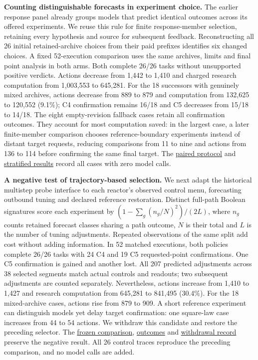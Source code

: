 \documentclass[twoside,11pt]{article}
\begin{document}
\textbf{Counting distinguishable forecasts in experiment choice.} The earlier response panel already groups models that predict identical outcomes across its offered experiments. We reuse this rule for finite response-member selection, retaining every hypothesis and source for subsequent feedback. Reconstructing all 26 initial retained-archive choices from their paid prefixes identifies six changed choices. A fixed 52-execution comparison uses the same archives, limits and final point analysis in both arms. Both complete 26/26 tasks without unsupported positive verdicts. Actions decrease from 1,442 to 1,410 and charged research computation from 1,003,553 to 645,281. For the 18 successors with genuinely mixed archives, actions decrease from 889 to 879 and computation from 132,625 to 120,552 (9.1\%); C4 confirmation remains 16/18 and C5 decreases from 15/18 to 14/18. The eight empty-revision fallback cases retain all confirmation outcomes. They account for most computation saved: in the largest case, a later finite-member comparison chooses reference-boundary experiments instead of distant target requests, reducing comparisons from 11 to nine and actions from 136 to 114 before confirming the same final target. The \hyperlink{artifact-153}{paired protocol} and \hyperlink{artifact-154}{stratified results} record all cases with zero model calls.


\textbf{A negative test of trajectory-based selection.} We next adapt the historical multistep probe interface to each reactor's observed control menu, forecasting outbound tuning and declared reference restoration. Distinct full-path Boolean signatures score each experiment by \((1-\sum_g(n_g/N)^2)/(2L)\), where \(n_g\) counts retained forecast classes sharing a path outcome, \(N\) is their total and \(L\) is the number of tuning adjustments. Repeated observations of the same split add cost without adding information. In 52 matched executions, both policies complete 26/26 tasks with 24 C4 and 19 C5 requested-point confirmations. One C5 confirmation is gained and another lost. All 207 predicted adjustments across 38 selected segments match actual controls and readouts; two subsequent adjustments are counted separately. Nevertheless, actions increase from 1,410 to 1,427 and research computation from 645,281 to 841,495 (30.4\%). For the 18 mixed-archive cases, actions rise from 879 to 909. A short reference experiment can distinguish models yet delay target confirmation: one square-law case increases from 44 to 54 actions. We withdraw this candidate and restore the preceding selector. The \hyperlink{artifact-155}{frozen comparison}, \hyperlink{artifact-156}{outcomes} and \hyperlink{artifact-157}{withdrawal record} preserve the negative result. All 26 control traces reproduce the preceding comparison, and no model calls are added.
\end{document}
